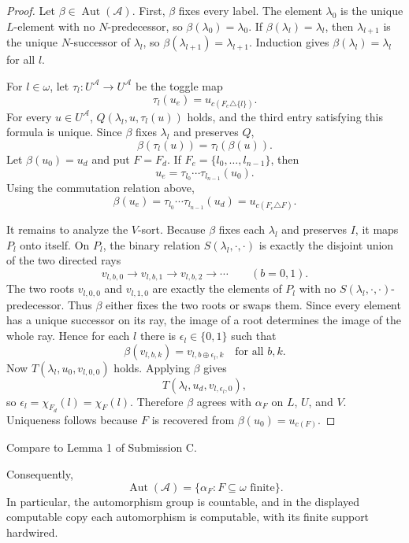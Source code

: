 \documentclass[12pt]{article}
\theoremstyle{definition}
\theoremstyle{remark}
\newcommand{\Aut}{\operatorname{Aut}}
\newcommand{\review}[1]{\begin{reviewbox}#1\end{reviewbox}}
\begin{document}
\begin{proof}
Let \(\beta\in\Aut(\mathcal A)\).  First, \(\beta\) fixes every label.  The element \(\lambda_0\) is the unique \(L\)-element with no \(N\)-predecessor, so \(\beta(\lambda_0)=\lambda_0\).  If \(\beta(\lambda_l)=\lambda_l\), then \(\lambda_{l+1}\) is the unique \(N\)-successor of \(\lambda_l\), so \(\beta(\lambda_{l+1})=\lambda_{l+1}\).  Induction gives \(\beta(\lambda_l)=\lambda_l\) for all \(l\).

For \(l\in\omega\), let \(\tau_l:U^{\mathcal A}\to U^{\mathcal A}\) be the toggle map
\[
\tau_l(u_e)=u_{c(F_e\triangle\{l\})}.
\]
For every \(u\in U^{\mathcal A}\), \(Q(\lambda_l,u,\tau_l(u))\) holds, and the third entry satisfying this formula is unique.  Since \(\beta\) fixes \(\lambda_l\) and preserves \(Q\),
\[
\beta(\tau_l(u))=\tau_l(\beta(u)).
\]
Let \(\beta(u_0)=u_d\) and put \(F=F_d\).  If \(F_e=\{l_0,\dots,l_{n-1}\}\), then
\[
u_e=\tau_{l_0}\cdots\tau_{l_{n-1}}(u_0).
\]
Using the commutation relation above,
\[
\beta(u_e)
=\tau_{l_0}\cdots\tau_{l_{n-1}}(u_d)
=u_{c(F_e\triangle F)}.
\]

It remains to analyze the \(V\)-sort.  Because \(\beta\) fixes each \(\lambda_l\) and preserves \(I\), it maps \(P_l\) onto itself.  On \(P_l\), the binary relation \(S(\lambda_l,\cdot,\cdot)\) is exactly the disjoint union of the two directed rays
\[
v_{l,b,0}\to v_{l,b,1}\to v_{l,b,2}\to\cdots
\qquad (b=0,1).
\]
The two roots \(v_{l,0,0}\) and \(v_{l,1,0}\) are exactly the elements of \(P_l\) with no \(S(\lambda_l,\cdot,\cdot)\)-predecessor.  Thus \(\beta\) either fixes the two roots or swaps them.  Since every element has a unique successor on its ray, the image of a root determines the image of the whole ray.  Hence for each \(l\) there is \(\epsilon_l\in\{0,1\}\) such that
\[
\beta(v_{l,b,k})=v_{l,b\oplus\epsilon_l,k}
\quad\text{for all }b,k.
\]
Now \(T(\lambda_l,u_0,v_{l,0,0})\) holds.  Applying \(\beta\) gives
\[
T(\lambda_l,u_d,v_{l,\epsilon_l,0}),
\]
so \(\epsilon_l=\chi_{F_d}(l)=\chi_F(l)\).  Therefore \(\beta\) agrees with \(\alpha_F\) on \(L\), \(U\), and \(V\).  Uniqueness follows because \(F\) is recovered from \(\beta(u_0)=u_{c(F)}\).
\end{proof}

\review{Compare to Lemma 1 of Submission C.}

Consequently,
\[
\Aut(\mathcal A)=\{\alpha_F:F\subseteq\omega\text{ finite}\}.
\]
In particular, the automorphism group is countable, and in the displayed computable copy each automorphism is computable, with its finite support hardwired.
\end{document}
